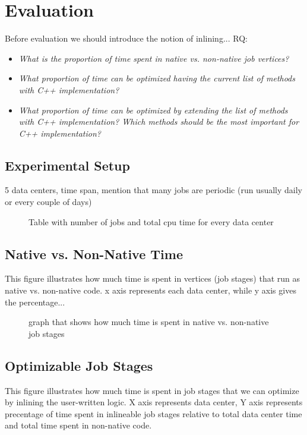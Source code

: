 \section{Evaluation}
Before evaluation we should introduce the notion of inlining...
RQ:
\begin{itemize}
\item \emph{What is the proportion of time spent in native vs. non-native job vertices?}

\item \emph{What proportion of time can be optimized having the current list of methods with C++ implementation?}

\item \emph{What proportion of time can be optimized by extending the list of methods with C++ implementation? Which methods should be the most important for C++ implementation?}


\end{itemize}

\subsection{Experimental Setup}
5 data centers, time span, mention that many jobs are periodic (run usually daily or every couple of days)

\begin{figure}[ht]

\caption{Table with number of jobs and total cpu time for every data center}
\end{figure}

\subsection{Native vs. Non-Native Time}


This figure illustrates how much time is spent in vertices (job stages) that run as native vs. non-native code. x axis represents each data center, while y axis gives the percentage... 
\begin{figure}[ht]

\caption{graph that shows how much time is spent in native vs. non-native job stages}
\end{figure}

\subsection{Optimizable Job Stages}

This figure illustrates how much time is spent in job stages that we can optimize by inlining the user-written logic. X axis represents data center, Y axis represents precentage of time spent in inlineable job stages relative to total data center time and total time spent in non-native code.

